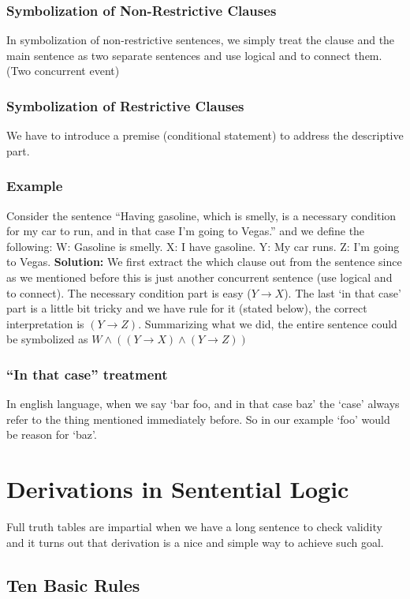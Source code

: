 \documentclass[10pt]{article}
\begin{document}
\subsubsection{Symbolization of Non-Restrictive Clauses} In symbolization of
non-restrictive sentences, we simply treat the clause and the main sentence 
as two separate sentences and use logical and to connect them. (Two concurrent
event)
\subsubsection{Symbolization of Restrictive Clauses} We have to introduce a 
premise (conditional statement) to address the descriptive part.

\subsubsection{Example}
Consider the sentence ``Having gasoline, which is smelly, is a necessary 
condition for my car to run, and in that case I'm going to Vegas.'' and we
define the following: W: Gasoline is smelly. X: I have gasoline. Y: My car runs.
Z: I'm going to Vegas. \textbf{Solution:} We first extract the which clause out
from the sentence since as we mentioned before this is just another concurrent 
sentence (use logical and to connect). The necessary condition part is easy ($Y\rightarrow X$).
The last `in that case' part is a little bit tricky and we have rule for it (stated below), 
the correct interpretation is $(Y\rightarrow Z)$. Summarizing what we did, the
entire sentence could be symbolized as $W\land ((Y\rightarrow X)\land (Y\rightarrow Z))$

\subsubsection{``In that case'' treatment}
In english language, when we say `bar foo, and in that case baz' the `case' always refer
to the thing mentioned immediately before. So in our example `foo' would be reason for `baz'.

\section{Derivations in Sentential Logic}
Full truth tables are impartial when we have a long sentence to check validity 
and it turns out that derivation is a nice and simple way to achieve such goal.

\subsection{Ten Basic Rules}
\end{document}
